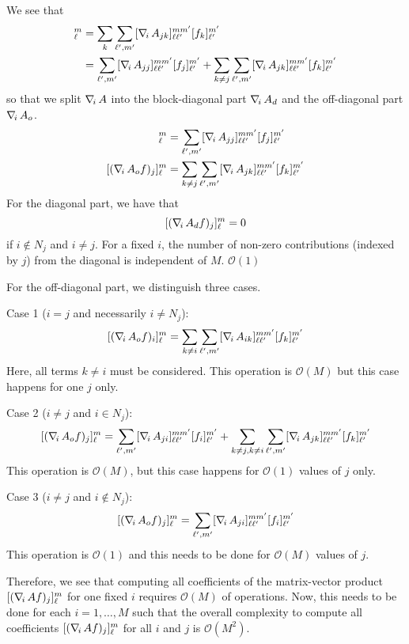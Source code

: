 We see that 
\begin{align*}
	[(\nablai A f)_j]_\ell^m 
	&= \sum_k \sum_{\ell',m'} [\nablai A_{jk}]_{\ell \ell'}^{m m'} [f_k]_{\ell'}^{m'} \\
	&= \sum_{\ell',m'} [\nablai A_{jj}]_{\ell \ell'}^{m m'} [f_j]_{\ell'}^{m'} 
	+ \sum_{k\neq j} \sum_{\ell',m'} [\nablai A_{jk}]_{\ell \ell'}^{m m'} [f_k]_{\ell'}^{m'} 
\end{align*}
so that we split $\nabla_{\!i}\, A$ into the block-diagonal part $\nabla_{\!i}\, A_d$ and the off-diagonal part $\nabla_{\!i}\, A_o$.
\begin{align*}
	[(\nablai A_d f)_j]_\ell^m 
	&= \sum_{\ell',m'} [\nablai A_{jj}]_{\ell \ell'}^{m m'} [f_j]_{\ell'}^{m'} \\
	[(\nablai A_o f)_j]_\ell^m 
	&= \sum_{k\neq j} \sum_{\ell',m'} [\nablai A_{jk}]_{\ell \ell'}^{m m'} [f_k]_{\ell'}^{m'} 
\end{align*}
For the diagonal part, we have that
\[
	[(\nabla_{\!i}\, A_d f)_j]_\ell^m = 0
\]
if $i\not\in N_j$ and $i\neq j$. For a fixed $i$, the number of non-zero contributions (indexed by $j$) from the diagonal is independent of $M$. $\mathcal O(1)$

For the off-diagonal part, we distinguish three cases.

Case 1 ($i=j$ and necessarily $i\neq N_j$):
\[
	[(\nabla_{\!i}\, A_o f)_i]_\ell^m 
	= 	\sum_{k\neq i} \sum_{\ell',m'} [\nabla_{\!i}\, A_{ik}]_{\ell \ell'}^{m m'} [f_k]_{\ell'}^{m'} 
\]
Here, all terms $k\neq i$ must be considered. This operation is $\mathcal O(M)$ but this case happens for one $j$ only.

Case 2 ($i\neq j$ and $i\in N_j$):
\[
	[(\nabla_{\!i}\, A_o f)_j]_\ell^m 
	= \sum_{\ell',m'} [\nabla_{\!i}\, A_{ji}]_{\ell \ell'}^{m m'} [f_i]_{\ell'}^{m'} 
	+ \sum_{k\neq j, k\neq i} \sum_{\ell',m'} [\nabla_{\!i}\, A_{jk}]_{\ell \ell'}^{m m'} [f_k]_{\ell'}^{m'} 
\]
This operation is $\mathcal O(M)$, but this case happens for $\mathcal O(1)$ values of $j$ only.

Case 3 ($i\neq j$ and $i\not \in N_j$):
\[
	[(\nabla_{\!i}\, A_o f)_j]_\ell^m 
	= \sum_{\ell',m'} [\nabla_{\!i}\, A_{ji}]_{\ell \ell'}^{m m'} [f_i]_{\ell'}^{m'} 
\]
This operation is $\mathcal O(1)$ and this needs to be done for $\mathcal O(M)$ values of $j$.

Therefore, we see that computing all coefficients of the matrix-vector product $[(\nabla_{\!i}\, A f)_j]_\ell^m $ for one fixed $i$ requires $\mathcal O(M)$ of operations. 
Now, this needs to be done for each $i=1,\ldots,M$ such that the overall complexity to compute all coefficients $[(\nabla_{\!i}\, A f)_j]_\ell^m $ for all $i$ and $j$ is $\mathcal O(M^2)$.



